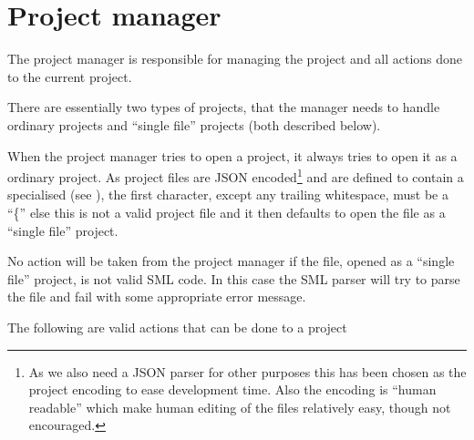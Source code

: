 \section{Project manager}
\label{sec:design-project-manager}

The project manager is responsible for managing the project and all actions done
to the current project. 

There are essentially two types of projects, that the manager needs to handle
ordinary projects and ``single file'' projects (both described below). 

When the project manager tries to open a project, it always tries to open it as
a ordinary project. As project files are JSON encoded\footnote{As we also need a
  JSON parser for other purposes this has been chosen as the project encoding to
  ease development time. Also the encoding is ``human readable'' which make
  human editing of the files relatively easy, though not encouraged.} and are
defined to contain a specialised  (see
), the first character, except any trailing whitespace,
must be a ``\{'' else this is not a valid project file and it then defaults to
open the file as a ``single file'' project.

No action will be taken from the project manager if the file, opened as a
``single file'' project, is not valid SML code. In this case the SML parser will
try to parse the file and fail with some appropriate error message.

The following are valid actions that can be done to a project

